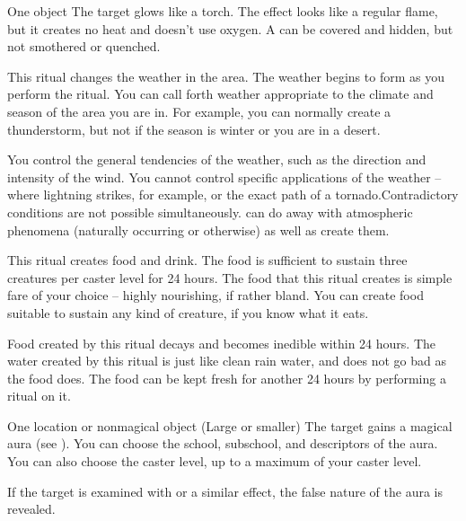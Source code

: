 \begin{spelltarget}{One object}
    \spelleffect The target glows like a torch. The effect looks like a regular flame, but it creates no heat and doesn't use oxygen. A  can be covered and hidden, but not smothered or quenched.
\end{spelltarget}

\spelldur{\durext}
\spelleffect This ritual changes the weather in the area. The weather begins to form as you perform the ritual. You can call forth weather appropriate to the climate and season of the area you are in. For example, you can normally create a thunderstorm, but not if the season is winter or you are in a desert.
\par You control the general tendencies of the weather, such as the direction and intensity of the wind. You cannot control specific applications of the weather -- where lightning strikes, for example, or the exact path of a tornado.Contradictory conditions are not possible simultaneously.
\spellnotes {} can do away with atmospheric phenomena (naturally occurring or otherwise) as well as create them.

\spellrng{\rngclose}
\spellline
\spelleffect This ritual creates food and drink. The food is sufficient to sustain three creatures per caster level for 24 hours. The food that this ritual creates is simple fare of your choice -- highly nourishing, if rather bland. You can create food suitable to sustain any kind of creature, if you know what it eats.

Food created by this ritual decays and becomes inedible within 24 hours. The water created by this ritual is just like clean rain water, and does not go bad as the food does.
\spellnotes The food can be kept fresh for another 24 hours by performing a  ritual on it.

\begin{spelltarget}{One location or nonmagical object (Large or smaller)}
    \spelleffect The target gains a magical aura (see ). You can choose the school, subschool, and descriptors of the aura. You can also choose the caster level, up to a maximum of your caster level.
\end{spelltarget}
\spellnotes If the target is examined with  or a similar effect, the false nature of the aura is revealed.

